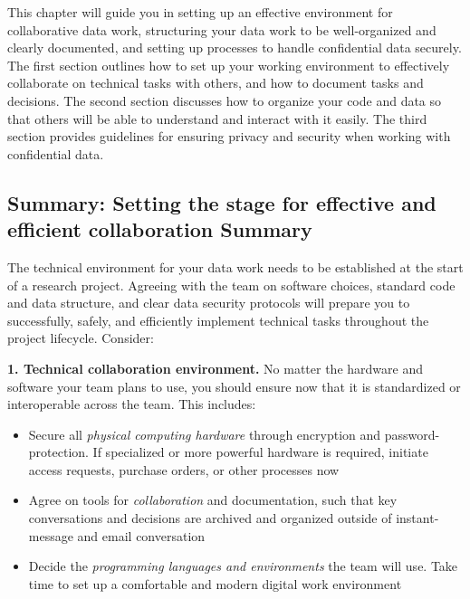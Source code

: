 \documentclass[
]{book}
\providecommand{\tightlist}{%
  \setlength{\itemsep}{0pt}\setlength{\parskip}{0pt}}
\begin{document}
This chapter will guide you in setting up an effective environment for collaborative data work,
structuring your data work to be well-organized and clearly documented,
and setting up processes to handle confidential data securely.
The first section outlines how to set up your working environment
to effectively collaborate on technical tasks with others,
and how to document tasks and decisions.
The second section discusses how to organize your code and data so that others
will be able to understand and interact with it easily.
The third section provides guidelines for ensuring
privacy and security when working with confidential data.

\begin{summary}
\hypertarget{summary-setting-the-stage-for-effective-and-efficient-collaboration-summary}{%
\subsection*{Summary: Setting the stage for effective and efficient collaboration Summary}\label{summary-setting-the-stage-for-effective-and-efficient-collaboration-summary}}

The technical environment for your data work needs to be established at the start of a research project. Agreeing with the team on software choices, standard code and data structure, and clear data security protocols will prepare you to successfully, safely, and efficiently implement technical tasks throughout the project lifecycle. Consider:

\textbf{1. Technical collaboration environment.} No matter the hardware and software your team plans to use, you should ensure now that it is standardized or interoperable across the team. This includes:

\begin{itemize}
\tightlist
\item
  Secure all \emph{physical computing hardware} through encryption and password-protection. If specialized or more powerful hardware is required, initiate access requests, purchase orders, or other processes now
\item
  Agree on tools for \emph{collaboration} and documentation, such that key conversations and decisions are archived and organized outside of instant-message and email conversation
\item
  Decide the \emph{programming languages and environments} the team will use. Take time to set up a comfortable and modern digital work environment
\end{itemize}


\end{summary}
\end{document}
